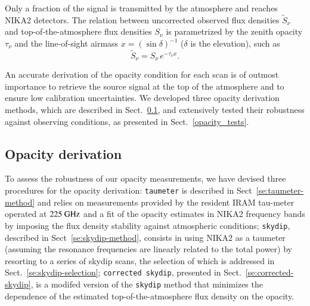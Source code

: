 
Only a fraction of the signal is transmitted by the atmosphere and
reaches NIKA2 detectors. 
The relation between uncorrected observed flux densities
$\tilde{S}_{\nu}$ and top-of-the-atmosphere flux densities $S_{\nu}$
is parametrized by the zenith opacity $\tau_{\nu}$
and the line-of-sight airmass $x = \left(\sin\delta\right)^{-1}$ ($\delta$ is the elevation), such as
\begin{equation}
\tilde{S}_{\nu} = S_{\nu} \, e^{-\tau_{\nu}  x}.
\label{eq:uncorr_flux}
\end{equation}

An accurate derivation of the opacity condition for each scan is
of outmost importance to retrieve the source signal at the top of the
atmosphere and to ensure low calibration uncertainties.
We developed three opacity derivation methods, which are described in
Sect.~\ref{se:opacity_methods}, and extensively tested their
robustness against observing conditions, as presented in
Sect.~\ref{opacity_tests}.


\subsection{Opacity derivation}
\label{se:opacity_methods}

To assess the robustness of our opacity measurements, we have devised
three procedures for the opacity derivation: {\tt taumeter} is
described in Sect~\ref{se:taumeter-method} and relies on measurements
provided by the resident IRAM tau-meter operated at $225~\rm{GHz}$ and
a fit of the opacity estimates in NIKA2 frequency bands by imposing
the flux density stability against atmospheric conditions;
{\tt skydip}, described in Sect~\ref{se:skydip-method}, consists in
using NIKA2 as a taumeter (assuming the resonance frequencies are
linearly related to the total power) by resorting to a series of
skydip scans, the selection of which is addressed in
Sect.~\ref{se:skydip-selection}; {\tt corrected skydip}, presented in
Sect.~\ref{se:corrected-skydip}, is a modifed
version of the {\tt skydip} method that minimizes the dependence of the
estimated top-of-the-atmosphere flux density on the opacity.

